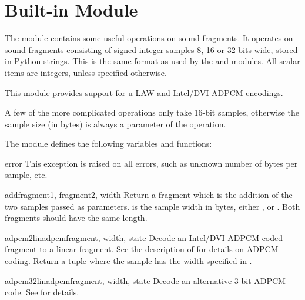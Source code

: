 \section{Built-in Module }



The  module contains some useful operations on sound
fragments.  It operates on sound fragments consisting of signed
integer samples 8, 16 or 32 bits wide, stored in Python strings.  This
is the same format as used by the  and 
modules.  All scalar items are integers, unless specified otherwise.

This module provides support for u-LAW and Intel/DVI ADPCM encodings.

A few of the more complicated operations only take 16-bit samples,
otherwise the sample size (in bytes) is always a parameter of the
operation.

The module defines the following variables and functions:

\begin{excdesc}{error}
This exception is raised on all errors, such as unknown number of bytes
per sample, etc.
\end{excdesc}

\begin{funcdesc}{add}{fragment1, fragment2, width}
Return a fragment which is the addition of the two samples passed as
parameters.   is the sample width in bytes, either
,  or .  Both fragments should have the same
length.
\end{funcdesc}

\begin{funcdesc}{adpcm2lin}{adpcmfragment, width, state}
Decode an Intel/DVI ADPCM coded fragment to a linear fragment.  See
the description of  for details on ADPCM coding.
Return a tuple  where the sample
has the width specified in .
\end{funcdesc}

\begin{funcdesc}{adpcm32lin}{adpcmfragment, width, state}
Decode an alternative 3-bit ADPCM code.  See 
for details.
\end{funcdesc}

